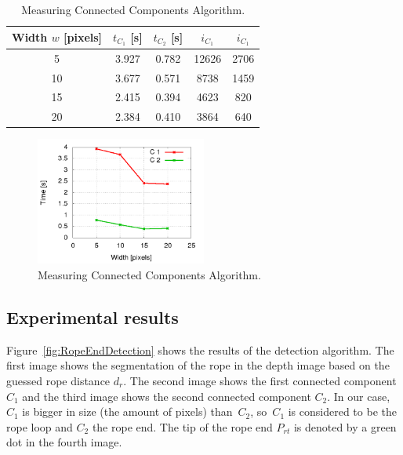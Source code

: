             \begin{table}\centering
            \begin{tabular}{@{}ccccc@{}}\toprule
            Width $w$ [pixels] & $ t_{C_1}$ [s] & $t_{C_2}$ [s] & $i_{C_1}$ & $i_{C_1}$ \\ \midrule
            5 & 3.927 & 0.782 & 12626 & 2706 \\
            10 & 3.677 & 0.571 & 8738 & 1459 \\
            15 & 2.415 & 0.394 & 4623 & 820 \\
            20 & 2.384 & 0.410 & 3864 & 640 \\

            \bottomrule
            \end{tabular}
            \caption{Measuring Connected Components Algorithm.}
            \label{table:MeasuringConnectedComponents}
            \end{table}

            \begin{figure}
            \includegraphics[width=0.5\textwidth]{MeasuringConnectedComponents.png}
            \centering
            \caption{Measuring Connected Components Algorithm.}
            \label{fig:MeasuringConnectedComponents}
            \end{figure}



        \subsection{Experimental results}

            Figure~\ref{fig:RopeEndDetection} shows the results of the detection algorithm. The first image shows the segmentation of the rope in the depth image based on the guessed rope distance $d_r$. The second image shows the first connected component $C_1$ and the third image shows the second connected component $C_2$. In our case, $C_1$ is bigger in size (the amount of pixels) than~$C_2$, so~$C_1$ is considered to be the rope loop and $C_2$ the rope end. The tip of the rope end $P_{rt}$ is denoted by a green dot in the fourth image.

